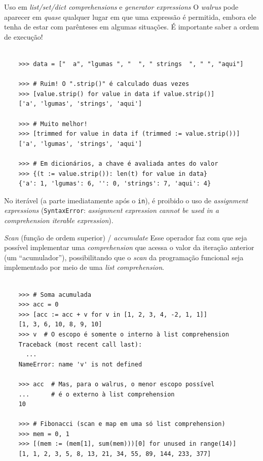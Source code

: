 \documentclass[utf8]{beamer}
\begin{document}
\begin{frame}[fragile]{Uso em \emph{list/set/dict comprehensions}
                       e \emph{generator expressions}}
  O \emph{walrus} pode aparecer
  em \emph{quase} qualquer lugar em que uma expressão é permitida,
  embora ele tenha de estar com parênteses em algumas situações.
  É importante saber a ordem de execução!
  \vfill
  \vspace{-.5em}
  \begin{verbatim}

    >>> data = ["  a", "lgumas ", "  ", " strings  ", " ", "aqui"]

    >>> # Ruim! O ".strip()" é calculado duas vezes
    >>> [value.strip() for value in data if value.strip()]
    ['a', 'lgumas', 'strings', 'aqui']

    >>> # Muito melhor!
    >>> [trimmed for value in data if (trimmed := value.strip())]
    ['a', 'lgumas', 'strings', 'aqui']

    >>> # Em dicionários, a chave é avaliada antes do valor
    >>> {(t := value.strip()): len(t) for value in data}
    {'a': 1, 'lgumas': 6, '': 0, 'strings': 7, 'aqui': 4}

  \end{verbatim}
  \vfill
  \vspace{-.5em}
  No iterável (a parte imediatamente após o \texttt{in}),
  é proibido o uso de \emph{assignment expressions}
  (\texttt{SyntaxError}:
   \emph{assignment expression cannot be used
         in a comprehension iterable expression}).
\end{frame}


\begin{frame}[fragile]{\emph{Scan} (função de ordem superior) /
                       \emph{accumulate}}
  Esse operador faz com que seja possível implementar
  uma \emph{comprehension} que acessa o valor da iteração anterior
  (um ``acumulador''),
  possibilitando que o \emph{scan} da programação funcional
  seja implementado por meio de uma \emph{list comprehension}.
  \vspace{-.5em}
  \begin{verbatim}

    >>> # Soma acumulada
    >>> acc = 0
    >>> [acc := acc + v for v in [1, 2, 3, 4, -2, 1, 1]]
    [1, 3, 6, 10, 8, 9, 10]
    >>> v  # O escopo é somente o interno à list comprehension
    Traceback (most recent call last):
      ...
    NameError: name 'v' is not defined

    >>> acc  # Mas, para o walrus, o menor escopo possível
    ...      # é o externo à list comprehension
    10

    >>> # Fibonacci (scan e map em uma só list comprehension)
    >>> mem = 0, 1
    >>> [(mem := (mem[1], sum(mem)))[0] for unused in range(14)]
    [1, 1, 2, 3, 5, 8, 13, 21, 34, 55, 89, 144, 233, 377]

  \end{verbatim}
\end{frame}
\end{document}
